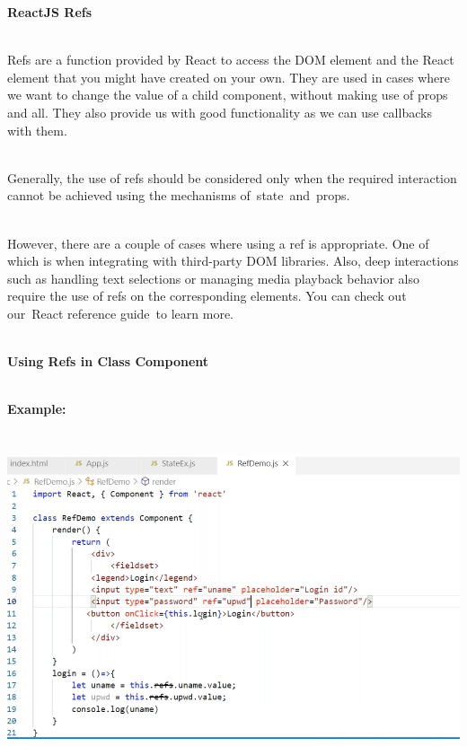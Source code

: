 \documentclass{article}
\begin{document}
\noindent \textbf{ReactJS {\textbar} Refs}

\noindent 

\noindent \\
Refs are a function provided by React to access the DOM element and the React element that you might have created on your own. They are used in cases where we want to change the value of a child component, without making use of props and all. They also provide us with good functionality as we can use callbacks with them.~

\noindent 

\noindent 
\\
Generally, the use of refs should be considered only when the required interaction cannot be achieved using the mechanisms of~state~and~props.

\noindent 
\\
However, there are a couple of cases where using a ref is appropriate. One of which is when integrating with third-party DOM libraries. Also, deep interactions such as handling text selections or managing media playback behavior also require the use of refs on the corresponding elements. You can check out our~React reference guide~to learn more.

\noindent 

\noindent 

\noindent \\
\textbf{Using Refs in Class Component}

\noindent \textbf{}

\noindent \textbf{}

\noindent \\
\textbf{Example:~}~

\noindent 

\begin{center}
	\noindent \includegraphics*[width=6.23in, height=3.88in]{IMG-10-14}
\end{center}
\end{document}
